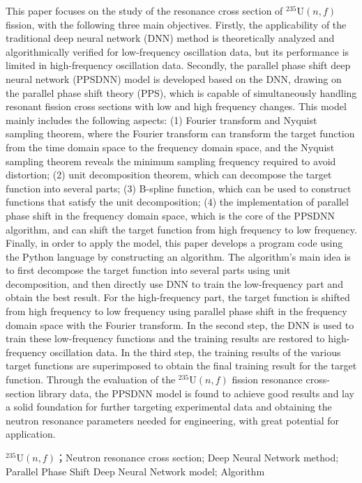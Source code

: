 This paper focuses on the study of the resonance cross section of $^{235}\text{U}(n,f)$ fission, with the following three main objectives. Firstly, the applicability of the traditional deep neural network (DNN) method is theoretically analyzed and algorithmically verified for low-frequency oscillation data, but its performance is limited in high-frequency oscillation data. Secondly, the parallel phase shift deep neural network (PPSDNN) model is developed based on the DNN, drawing on the parallel phase shift theory (PPS), which is capable of simultaneously handling resonant fission cross sections with low and high frequency changes. This model mainly includes the following aspects: (1) Fourier transform and Nyquist sampling theorem, where the Fourier transform can transform the target function from the time domain space to the frequency domain space, and the Nyquist sampling theorem reveals the minimum sampling frequency required to avoid distortion; (2) unit decomposition theorem, which can decompose the target function into several parts; (3) B-spline function, which can be used to construct functions that satisfy the unit decomposition; (4) the implementation of parallel phase shift in the frequency domain space, which is the core of the PPSDNN algorithm, and can shift the target function from high frequency to low frequency. Finally, in order to apply the model, this paper develops a program code using the Python language by constructing an algorithm. The algorithm's main idea is to first decompose the target function into several parts using unit decomposition, and then directly use DNN to train the low-frequency part and obtain the best result. For the high-frequency part, the target function is shifted from high frequency to low frequency using parallel phase shift in the frequency domain space with the Fourier transform. In the second step, the DNN is used to train these low-frequency functions and the training results are restored to high-frequency oscillation data. In the third step, the training results of the various target functions are superimposed to obtain the final training result for the target function. Through the evaluation of the $^{235}\text{U}(n,f)$ fission resonance cross-section library data, the PPSDNN model is found to achieve good results and lay a solid foundation for further targeting experimental data and obtaining the neutron resonance parameters needed for engineering, with great potential for application.


\par
\vspace{0.5cm}
 {$^{235}\text{U}(n,f)$；Neutron resonance cross section; Deep Neural Network method; Parallel Phase Shift Deep Neural Network model; Algorithm}
